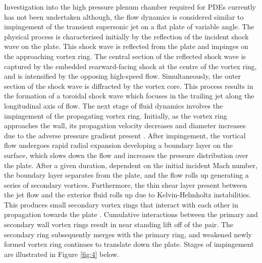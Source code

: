 Investigation into the high pressure plenum chamber required for PDEs currently has not been undertaken although, the flow dynamics is considered similar to impingement of the transient supersonic jet on a flat plate of variable angle. The physical process is characterised initially by the reflection of the incident shock wave on the plate. This shock wave is reflected from the plate and impinges on the approaching vortex ring. The central section of the reflected shock wave is captured by the embedded rearward-facing shock at the centre of the vortex ring, and is intensified by the opposing high-speed flow. Simultaneously, the outer section of the shock wave is diffracted by the vortex core. This process results in the formation of a toroidal shock wave which focuses in the trailing jet along the longitudinal axis of flow. The next stage of fluid dynamics involves the impingement of the propagating vortex ring. Initially, as the vortex ring approaches the wall, its propagation velocity decreases and diameter increases due to the adverse pressure gradient present \cite{szumowski2000}. After impingement, the vortical flow undergoes rapid radial expansion developing a boundary layer on the surface, which slows down the flow and increases the pressure distribution over the plate. After a given duration, dependent on the initial incident Mach number, the boundary layer separates from the plate, and the flow rolls up generating a series of secondary vortices. Furthermore, the thin shear layer present between the jet flow and the exterior fluid rolls up due to Kelvin-Helmholtz instabilities. This produces small secondary vortex rings that interact with each other in propagation towards the plate \cite{minota1997}. Cumulative interactions between the primary and secondary wall vortex rings result in near standing lift off of the pair. The secondary ring subsequently merges with the primary ring, and weakened newly formed vortex ring continues to translate down the plate. Stages of impingement are illustrated in Figure \ref{fig:4} below.

